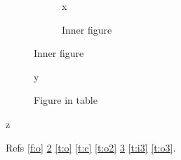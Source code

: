 \documentclass{article}
\begin{document}
\listoffigures
\listoftables

\begin{figure}
\caption{Outer figure}\label{f:o}
\begin{minipage}{.45\linewidth}
\begin{figure}[H]
\caption{Inner figure}\label{f:i}
x
\end{figure}
\end{minipage}
\end{figure}

\begin{table}
\caption{Outer table}\label{t:o}
\begin{minipage}{.45\linewidth}
\label{t:c}
\end{minipage}
\end{table}

\begin{table}
\caption{Outer two}\label{t:o2}
\begin{minipage}{.45\linewidth}
\begin{figure}[H]
\caption{Figure in table}\label{f:t}
y
\end{figure}
\end{minipage}
\end{table}

\begin{table}
\begin{minipage}{.45\linewidth}
\begin{table}[H]
\caption{Inner first}\label{t:i3}
z
\end{table}
\end{minipage}
\caption{Outer after}\label{t:o3}
\end{table}

Refs \ref{f:o} \ref{f:i} \ref{t:o} \ref{t:c} \ref{t:o2} \ref{f:t} \ref{t:i3} \ref{t:o3}.
\end{document}
